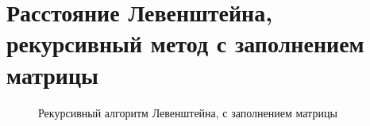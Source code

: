 \documentclass[12pt,a4paper]{report}
\begin{document}
\section{Расстояние Левенштейна, рекурсивный метод с заполнением матрицы}
\begin{figure}[ht]
	\caption{Рекурсивный алгоритм Левенштейна, с заполнением матрицы}
\end{figure}


\newpage
\end{document}
